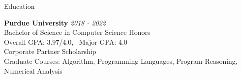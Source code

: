 \documentclass{resume} %
\begin{document}

\begin{rSection}{Education}

{\bf Purdue University} \hfill {\em 2018 - 2022} \\ 
Bachelor of Science in Computer Science Honors \smallskip \\
Overall GPA: 3.97/4.0, \ Major GPA: 4.0\\
Corporate Partner Scholarship\\
Graduate Courses: Algorithm, Programming Languages,
Program Reasoning, Numerical Analysis

\end{rSection}

\end{document}
